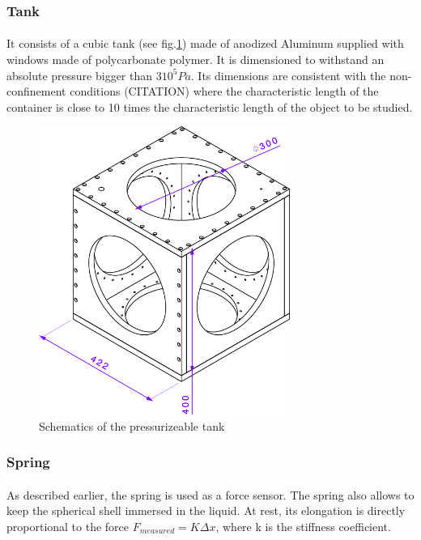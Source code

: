 \subsubsection{Tank}
\paragraph{}
It consists of a cubic tank (see fig.\ref{fig:tank}) made of anodized Aluminum supplied with windows made of polycarbonate polymer. It is dimensioned to withstand an absolute pressure bigger than $3 10^5 Pa$. Its dimensions are consistent with the non-confinement conditions (CITATION) where the characteristic length of the container is close to 10 times the characteristic length of the object to be studied.
\begin{figure}[H] %
	\centering%
  \includegraphics[width=0.73\textwidth]{figures/Chapter_1/cuve_representation.png}
	\caption{Schematics of the pressurizeable tank}
	\label{fig:tank}
\end{figure}
\subsubsection{Spring}
\paragraph{}
As described earlier, the spring is used as a force sensor. The spring also allows to keep the spherical shell immersed in the liquid.
At rest, its elongation is directly proportional to the force $F_{measured} = K \Delta x$, where k is the stiffness coefficient.
